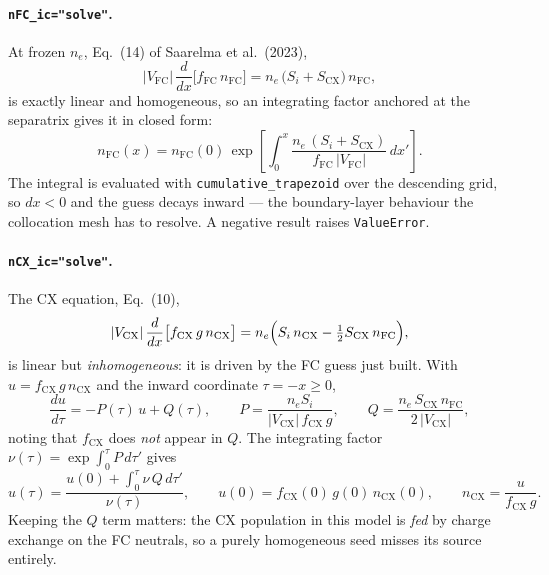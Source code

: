 \documentclass[11pt]{article}
\newcommand{\code}[1]{\texttt{#1}}
\begin{document}
\paragraph{\code{nFC\_ic="solve"}.}
At frozen $n_e$, Eq.~(14) of Saarelma et al.~(2023),
\begin{equation}
  |V_{\mathrm{FC}}|\,\frac{d}{dx}
    \bigl[f_{\mathrm{FC}}\,n_{\mathrm{FC}}\bigr]
  = n_e\,\bigl(S_i + S_{\mathrm{CX}}\bigr)\,n_{\mathrm{FC}},
\end{equation}
is exactly linear and homogeneous, so an integrating factor anchored at
the separatrix gives it in closed form:
\begin{equation}
  n_{\mathrm{FC}}(x) = n_{\mathrm{FC}}(0)\,
    \exp\!\left[\int_0^{x}
      \frac{n_e\,(S_i + S_{\mathrm{CX}})}
           {f_{\mathrm{FC}}\,|V_{\mathrm{FC}}|}\,dx'\right].
  \label{eq:fcguess}
\end{equation}
The integral is evaluated with \code{cumulative\_trapezoid} over the
descending grid, so $dx < 0$ and the guess decays inward --- the
boundary-layer behaviour the collocation mesh has to resolve.  A
negative result raises \code{ValueError}.

\paragraph{\code{nCX\_ic="solve"}.}
The CX equation, Eq.~(10),
\begin{equation}
  |V_{\mathrm{CX}}|\,\frac{d}{dx}
    \bigl[f_{\mathrm{CX}}\,g\,n_{\mathrm{CX}}\bigr]
  = n_e\Bigl(S_i\,n_{\mathrm{CX}}
      - \tfrac{1}{2}S_{\mathrm{CX}}\,n_{\mathrm{FC}}\Bigr),
\end{equation}
is linear but \emph{inhomogeneous}: it is driven by the FC guess just
built.  With $u = f_{\mathrm{CX}}\,g\,n_{\mathrm{CX}}$ and the inward
coordinate $\tau = -x \ge 0$,
\begin{equation}
  \frac{du}{d\tau} = -P(\tau)\,u + Q(\tau),
  \qquad
  P = \frac{n_e S_i}{|V_{\mathrm{CX}}|\,f_{\mathrm{CX}}\,g},
  \qquad
  Q = \frac{n_e\,S_{\mathrm{CX}}\,n_{\mathrm{FC}}}{2\,|V_{\mathrm{CX}}|},
\end{equation}
noting that $f_{\mathrm{CX}}$ does \emph{not} appear in $Q$.  The
integrating factor $\nu(\tau) = \exp\!\int_0^\tau P\,d\tau'$ gives
\begin{equation}
  u(\tau) = \frac{u(0) + \int_0^\tau \nu\,Q\,d\tau'}{\nu(\tau)},
  \qquad
  u(0) = f_{\mathrm{CX}}(0)\,g(0)\,n_{\mathrm{CX}}(0),
  \qquad
  n_{\mathrm{CX}} = \frac{u}{f_{\mathrm{CX}}\,g}.
  \label{eq:cxguess}
\end{equation}
Keeping the $Q$ term matters: the CX population in this model is
\emph{fed} by charge exchange on the FC neutrals, so a purely
homogeneous seed misses its source entirely.
\end{document}

